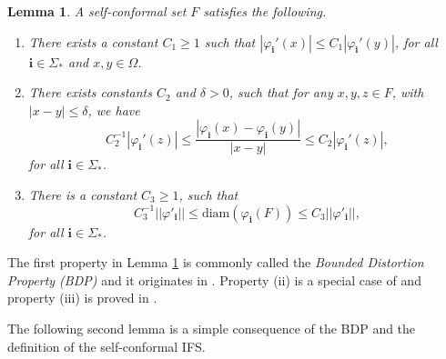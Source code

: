 \documentclass{PRM}
\newcommand{\norm}[1]{\left|\left|#1\right|\right|}
\newcommand{\diam}{\mathrm{diam}}
\theoremstyle{plain}
\newtheorem{lemma}[thm]{Lemma}
\theoremstyle{definition}
\theoremstyle{remark}
\begin{document}
\begin{lemma}\label{lemma:BDP}
A self-conformal set $F$ satisfies the following.

\begin{enumerate}
    \item There exists a constant $C_1\geq 1$ such that $|\varphi_{\mathbf{i}}'(x)|\leq C_1|\varphi_{\mathbf{i}}'(y)|$, for all $\mathbf{i}\in\Sigma_*$ and $x,y\in \Omega$.
    
    \item There exists constants $C_2$ and $\delta>0$, such that for any $x,y,z\in F$, with $|x-y|\leq \delta$, we have
    \begin{equation*}
        C_2^{-1}|\varphi_{\mathbf{i}}'(z)|\leq\frac{|\varphi_{\mathbf{i}}(x)-\varphi_{\mathbf{i}}(y)|}{|x-y|}\leq C_2|\varphi_{\mathbf{i}}'(z)|,
    \end{equation*}
    for all $\mathbf{i}\in\Sigma_*$.

    \item There is a constant $C_3\geq 1$, such that
    \begin{equation*}
        C_3^{-1}\norm{\varphi'_{\mathbf{i}}}\leq\diam(\varphi_{\mathbf{i}}(F)) \leq C_3\norm{\varphi'_{\mathbf{i}}},
    \end{equation*}
    for all $\mathbf{i}\in\Sigma_*$.
    
\end{enumerate}
\end{lemma}
The first property in Lemma \ref{lemma:BDP} is commonly called the \emph{Bounded Distortion Property (BDP)} and it originates in \cite{MU}. Property (ii) is a special case of \cite[Lemma 2.3]{Fan} and property (iii) is proved in \cite{MU}.

The following second lemma is a simple consequence of the BDP and the definition of the self-conformal IFS.
\end{document}
